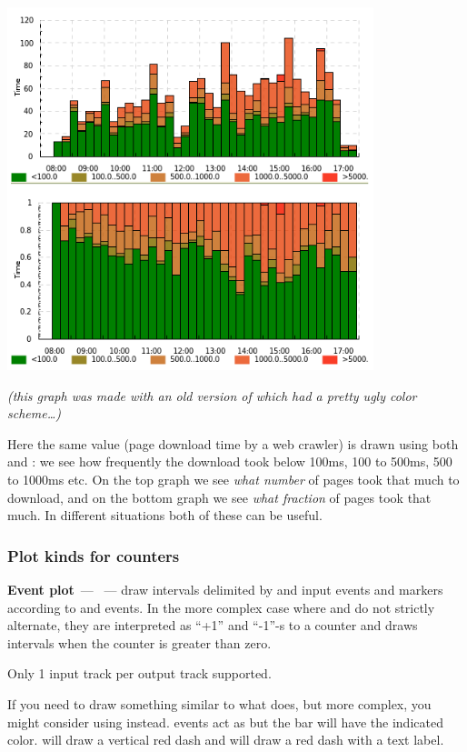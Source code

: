 \documentclass{article}
\begin{document}
\centerline{\includegraphics[width=0.8\textwidth]{pics/tplot/binf-binh.png}}

\emph{(this graph was made with an old version of \timeplot{} which had a pretty ugly color scheme\ldots)}

Here the same value (page download time by a web crawler) is drawn using both  and : we see how frequently the download took below 100ms, 100 to 500ms, 500 to 1000ms etc. On the top graph we see \emph{what number} of pages took that much to download, and on the bottom graph we see \emph{what fraction} of pages took that much. In different situations both of these can be useful.

\pagebreak
\subsubsection{Plot kinds for counters}
\noindent
\textbf{Event plot}~--- ~--- draw intervals delimited by \hlverb{>} and \hlverb{<} input events and markers according to  and \hlverb{!} events. In the more complex case where \hlverb{>} and \hlverb{<} do not strictly alternate, they are interpreted as ``+1'' and ``-1''-s to a counter and \timeplot{} draws intervals when the counter is greater than zero. 

Only 1 input track per output track supported.

If you need to draw something similar to what  does, but more complex, you might consider using \splot{} instead.  events act as \hlverb{>} but the bar will have the indicated color.  will draw a vertical red dash and  will draw a red dash with a text label. 
\end{document}
